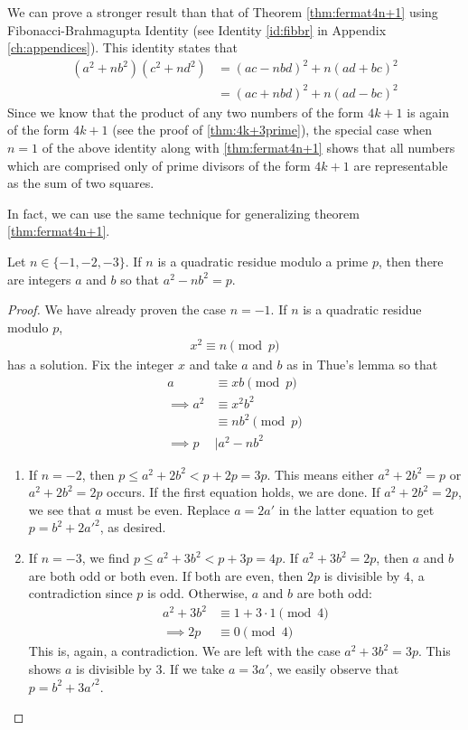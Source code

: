 \documentclass{subfile}
\begin{document}
	\begin{remark}
		We can prove a stronger result than that of Theorem \autoref{thm:fermat4n+1} using Fibonacci-Brahmagupta Identity (see Identity \ref{id:fibbr} in Appendix \ref{ch:appendices}). This identity states that
		\begin{align*}
			(a^2+nb^2)(c^2+nd^2)
				&=(ac-nbd)^2+n(ad+bc)^2\\
				&=(ac+nbd)^2+n(ad-bc)^2
		\end{align*}
	Since we know that the product of any two numbers of the form $4k+1$ is again of the form $4k+1$ (see the proof of \autoref{thm:4k+3prime}), the special case when $n=1$ of the above identity along with \autoref{thm:fermat4n+1} shows that all numbers which are comprised only of prime divisors of the form $4k+1$ are representable as the sum of two squares.
	\end{remark}
	In fact, we can use the same technique for generalizing theorem \autoref{thm:fermat4n+1}.
	\begin{theorem}\label{thm:gen4n+1}
		Let $n\in\{-1,-2,-3\}$. If $n$ is a quadratic residue modulo a prime $p$, then there are integers $a$ and $b$ so that $a^2-nb^2=p$.
	\end{theorem}

	\begin{proof}
		We have already proven the case $n=-1$. If $n$ is a quadratic residue modulo $p$,
		\begin{align*}
			x^2\equiv n\pmod p
		\end{align*}
		has a solution. Fix the integer $x$ and take $a$ and $b$ as in Thue's lemma so that
		\begin{align*}
			a
				& \equiv xb\pmod p\\
			\implies a^2
				& \equiv x^2b^2\\
				& \equiv nb^2\pmod p\\
			\implies p
				& \mid a^2-nb^2
		\end{align*}

		\begin{enumerate}
			\item If $n=-2$, then $p\leq a^2+2b^2<p+2p=3p$. This means either $a^2+2b^2=p$ or $a^2+2b^2=2p$ occurs. If the first equation holds, we are done. If $a^2+2b^2=2p$, we see that $a$ must be even. Replace $a=2a'$ in the latter equation to get $p=b^2+2a'^2$, as desired.
			\item If $n=-3$, we find $p\leq a^2+3b^2<p+3p=4p$. If $a^2+3b^2=2p$, then $a$ and $b$ are both odd or both even. If both are even, then $2p$ is divisible by $4$, a contradiction since $p$ is odd. Otherwise, $a$ and $b$ are both odd:
			\begin{align*}
				a^2+3b^2 & \equiv1+3\cdot 1\pmod 4\\
				\implies 2p	 & \equiv 0 \pmod 4
			\end{align*}
			This is, again, a contradiction. We are left with the case $a^2+3b^2=3p$. This shows $a$ is divisible by $3$. If we take $a=3a'$, we easily observe that $p=b^2+3a'^2$.
		\end{enumerate}
	\end{proof}
\end{document}
